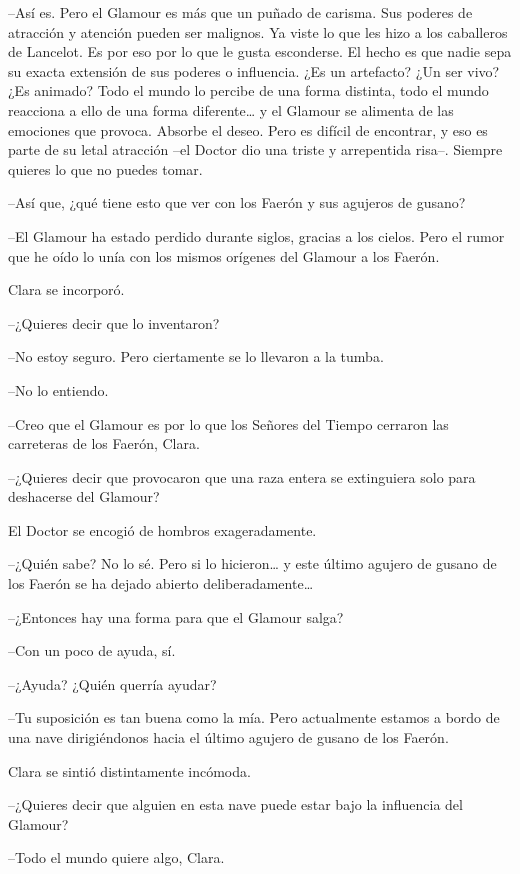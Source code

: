 {--Así es. Pero el Glamour es más que un puñado de carisma. Sus poderes
 de atracción y atención pueden ser malignos. Ya viste lo que les hizo a
 los caballeros de Lancelot. Es por eso por lo que le gusta esconderse.
 El hecho es que nadie sepa su exacta extensión de sus poderes o
 influencia. ¿Es un artefacto? ¿Un ser vivo? ¿Es animado? Todo el mundo
 lo percibe de una forma distinta, todo el mundo reacciona a ello de una
 forma diferente\ldots{} y el Glamour se alimenta de las emociones que
 provoca. Absorbe el deseo. Pero es difícil de encontrar, y eso es parte
 de su letal atracción --el Doctor dio una triste y arrepentida risa--.
Siempre quieres lo que no puedes tomar.}

{--Así que, ¿qué tiene esto que ver con los Faerón y sus agujeros de
gusano?}

{--El Glamour ha estado perdido durante siglos, gracias a los cielos.
 Pero el rumor que he oído lo unía con los mismos orígenes del Glamour a
los Faerón.}

{Clara se incorporó.}

{--¿Quieres decir que lo inventaron?}

{--No estoy seguro. Pero ciertamente se lo llevaron a la tumba.}

{--No lo entiendo.}

{--Creo que el Glamour es por lo que los Señores del Tiempo cerraron las
carreteras de los Faerón, Clara.}

{--¿Quieres decir que provocaron que una raza entera se extinguiera solo
para deshacerse del Glamour?}

{El Doctor se encogió de hombros exageradamente.}

{--¿Quién sabe? No lo sé. Pero si lo hicieron\ldots{} y este último
 agujero de gusano de los Faerón se ha dejado abierto
 deliberadamente\ldots{}}

{--¿Entonces hay una forma para que el Glamour salga?}

{--Con un poco de ayuda, sí.}

{--¿Ayuda? ¿Quién querría ayudar?}

{--Tu suposición es tan buena como la mía. Pero actualmente estamos a
 bordo de una nave dirigiéndonos hacia el último agujero de gusano de los
Faerón.}

{Clara se sintió distintamente incómoda.}

{--¿Quieres decir que alguien en esta nave puede estar bajo la influencia
del Glamour?}

{--Todo el mundo quiere algo, Clara.}

